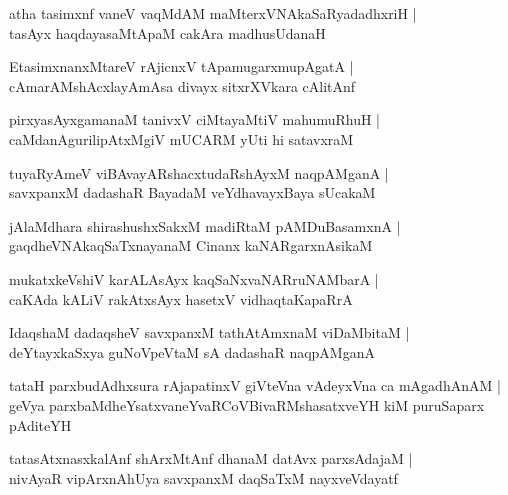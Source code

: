 \documentclass[twoside,12pt,openright]{book}
\newcounter{shloka}[chapter]
\begin{document}
\begin{shloka}%
atha tasimxnf vaneV vaqMdAM maMterxVNAkaSaRyadadhxriH |\\
tasAyx haqdayasaMtApaM cakAra madhusUdanaH 
\end{shloka}

\begin{shloka}%
EtasimxnanxMtareV rAjicnxV tApamugarxmupAgatA |\\
cAmarAMshAcxlayAmAsa divayx sitxrXVkara cAlitAnf 
\end{shloka}

\begin{shloka}%
pirxyasAyxgamanaM tanivxV ciMtayaMtiV mahumuRhuH |\\
caMdanAgurilipAtxMgiV mUCARM yUti hi satavxraM 
\end{shloka}

\begin{shloka}%
tuyaRyAmeV viBAvayARshacxtudaRshAyxM naqpAMganA |\\
savxpanxM dadashaR BayadaM veYdhavayxBaya sUcakaM 
\end{shloka}

\begin{shloka}%
jAlaMdhara shirashushxSakxM madiRtaM pAMDuBasamxnA |\\
gaqdheVNAkaqSaTxnayanaM Cinanx kaNARgarxnAsikaM 
\end{shloka}

\begin{shloka}%
mukatxkeVshiV karALAsAyx kaqSaNxvaNARruNAMbarA |\\
caKAda kALiV rakAtxsAyx hasetxV vidhaqtaKapaRrA 
\end{shloka}

\begin{shloka}%
IdaqshaM dadaqsheV savxpanxM tathAtAmxnaM viDaMbitaM |\\
deYtayxkaSxya guNoVpeVtaM sA dadashaR naqpAMganA 
\end{shloka}

\begin{shloka}%
tataH parxbudAdhxsura rAjapatinxV giVteVna vAdeyxVna ca mAgadhAnAM |\\
geVya parxbaMdheYsatxvaneYvaRCoVBivaRMshasatxveYH kiM puruSaparx pAditeYH
\end{shloka}

\begin{shloka}%
tatasAtxnasxkalAnf shArxMtAnf dhanaM datAvx parxsAdajaM |\\
nivAyaR vipArxnAhUya savxpanxM daqSaTxM nayxveVdayatf 
\end{shloka}
\end{document}
